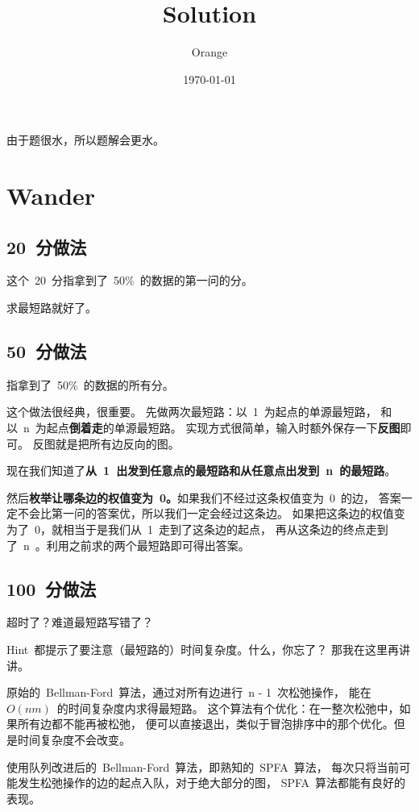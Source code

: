 \documentclass[12pt, hyperref, UTF8]{article}
\title{Solution}
\author{Orange}
\date{\today}
\begin{document}
	\heiti
	\maketitle

	\begin{center}
		由于题很水，所以题解会更水。
	\end{center}

	\newpage
	\section{Wander}
	\subsection{20~分做法}
	这个~20~分指拿到了~50\%~的数据的第一问的分。

	求最短路就好了。

	\subsection{50~分做法}
	指拿到了~50\%~的数据的所有分。
	
	这个做法很经典，很重要。
	先做两次最短路：以~1~为起点的单源最短路，
	和以~n~为起点\textbf{倒着走}的单源最短路。
	实现方式很简单，输入时额外保存一下\textbf{反图}即可。
	反图就是把所有边反向的图。

	现在我们知道了\textbf{从~1~出发到任意点的最短路和从任意点出发到~n~的最短路}。

	然后\textbf{枚举让哪条边的权值变为~0。}如果我们不经过这条权值变为~0~的边，
	答案一定不会比第一问的答案优，所以我们一定会经过这条边。
	如果把这条边的权值变为了~0，就相当于是我们从~1~走到了这条边的起点，
	再从这条边的终点走到了~n~。利用之前求的两个最短路即可得出答案。

	\subsection{100~分做法}
	超时了？难道最短路写错了？
	
	Hint~都提示了要注意（最短路的）时间复杂度。什么，你忘了？
	那我在这里再讲讲。

	原始的~Bellman-Ford~算法，通过对所有边进行~n - 1~次松弛操作，
	能在~$O(nm)$~的时间复杂度内求得最短路。
	这个算法有个优化：在一整次松弛中，如果所有边都不能再被松弛，
	便可以直接退出，类似于冒泡排序中的那个优化。但是时间复杂度不会改变。

	\bigskip
	使用队列改进后的~Bellman-Ford~算法，即熟知的~SPFA~算法，
	每次只将当前可能发生松弛操作的边的起点入队，对于绝大部分的图，
	SPFA~算法都能有良好的表现。
\end{document}
